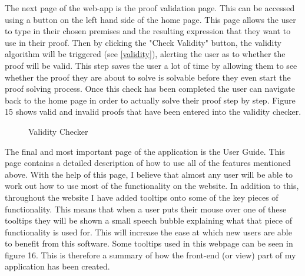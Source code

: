 The next page of the web-app is the proof validation page. This can be accessed using a button on the left hand side of the home page. This page allows the user to type in their chosen premises and the resulting expression that they want to use in their proof. Then by clicking the "Check Validity" button, the validity algorithm will be triggered (see \ref{validity}), alerting the user as to whether the proof will be valid. This step saves the user a lot of time by allowing them to see whether the proof they are about to solve is solvable before they even start the proof solving process. Once this check has been completed the user can navigate back to the home page in order to actually solve their proof step by step. Figure 15 shows valid and invalid proofs that have been entered into the validity checker.

\begin{figure}[!ht]
	\centering
	\caption{Validity Checker}
\end{figure}
\pagebreak

The final and most important page of the application is the User Guide. This page contains a detailed description of how to use all of the features mentioned above. With the help of this page, I believe that almost any user will be able to work out how to use most of the functionality on the website. In addition to this, throughout the website I have added tooltips onto some of the key pieces of functionality. This means that when a user puts their mouse over one of these tooltips they will be shown a small speech bubble explaining what that piece of functionality is used for. This will increase the ease at which new users are able to benefit from this software. Some tooltips used in this webpage can be seen in figure 16. This is therefore a summary of how the front-end (or view) part of my application has been created.

